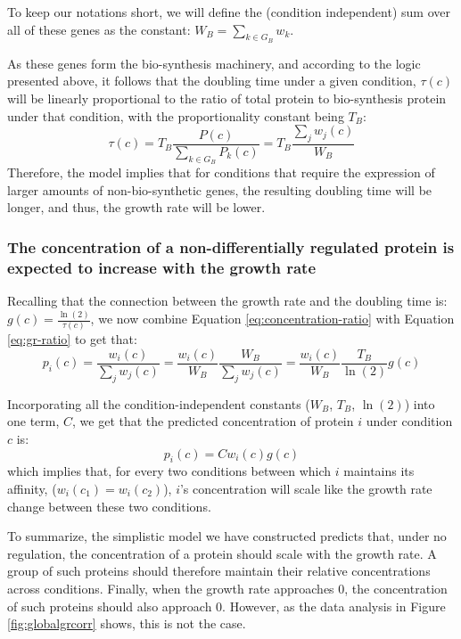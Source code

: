 \documentclass[notitlepage]{article}
\begin{document}
To keep our notations short, we will define the (condition independent) sum over all of these genes as the constant: $W_B = \sum_{k\in G_B}w_k$.

As these genes form the bio-synthesis machinery, and according to the logic presented above, it follows that the doubling time under a given condition, $\tau(c)$ will be linearly proportional to the ratio of total protein to bio-synthesis protein under that condition, with the proportionality constant being $T_B$:
\begin{equation}
  \label{eq:gr-ratio}
  \tau(c) = T_B\frac{P(c)}{\sum_{k\in G_B}P_k(c)}=T_B\frac{\sum_jw_j(c)}{W_B}
\end{equation}
Therefore, the model implies that for conditions that require the expression of larger amounts of non-bio-synthetic genes, the resulting doubling time will be longer, and thus, the growth rate will be lower.

\subsubsection{The concentration of a non-differentially regulated protein is expected to increase with the growth rate} 
Recalling that the connection between the growth rate and the doubling time is: $g(c)=\frac{\ln(2)}{\tau(c)}$, we now combine Equation \ref{eq:concentration-ratio} with Equation \ref{eq:gr-ratio} to get that:
\begin{equation}
  \label{eq:default-response}
  p_i(c)=\frac{w_i(c)}{\sum_jw_j(c)}=\frac{w_i(c)}{W_B}\frac{W_B}{\sum_jw_j(c)}=\frac{w_i(c)}{W_B}\frac{T_B}{\ln(2)}g(c)
\end{equation}

Incorporating all the condition-independent constants ($W_B$, $T_B$, $\ln(2)$) into one term, $C$, we get that the predicted concentration of protein $i$ under condition $c$ is:
\begin{equation}
  \label{eq:final-conc}
  p_i(c)=Cw_i(c)g(c)
\end{equation}
which implies that, for every two conditions between which $i$ maintains its affinity, ($w_i(c_1)=w_i(c_2)$), $i$'s concentration will scale like the growth rate change between these two conditions.

To summarize, the simplistic model we have constructed predicts that, under no regulation, the concentration of a protein should scale with the growth rate.
A group of such proteins should therefore maintain their relative concentrations across conditions.
Finally, when the growth rate approaches 0, the concentration of such proteins should also approach 0.
However, as the data analysis in Figure \ref{fig:globalgrcorr} shows, this is not the case.
\end{document}
